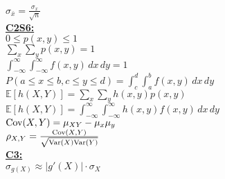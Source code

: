 \documentclass[letter, 12pt]{article}
\begin{document}
\begin{multicols}{2}
\(\sigma_{\bar{x}} = \frac{\sigma_x}{\sqrt{n}}\)\\
\textbf{\uline{C2S6:}}\\
\(0 \leq p(x,y) \leq 1\)\\
\(\sum_x \sum_y p(x,y) = 1\)\\
\(\int_{-\infty}^\infty \int_{-\infty}^\infty f(x,y)\,dx\,dy = 1\)\\
\(P(a \leq x \leq b, c \leq y \leq d) = \int_c^d \int_a^b f(x,y) \,dx\,dy\)\\
\(\mathds{E}[h(X,Y)] = \sum_x \sum_y h(x, y) p(x, y)\)\\
\(\mathds{E}[h(X,Y)] = \int_{-\infty}^\infty \int_{-\infty}^\infty h(x, y) f(x, y)\,dx\,dy\)\\
\(\textnormal{Cov}(X,Y) = \mu_{XY}-\mu_x\mu_y\)\\
\(\rho_{X,Y} = \frac{\textnormal{Cov}(X,Y)}{\sqrt{\textnormal{Var}(X)\textnormal{Var}(Y)}}\)\\
\textbf{\uline{C3:}}\\
\(\sigma_{g(X)} \approx \vert g'(X)\vert \cdot \sigma_X\)
\vfill
\columnbreak
\vspace*{\fill}
\end{multicols}
\end{document}
